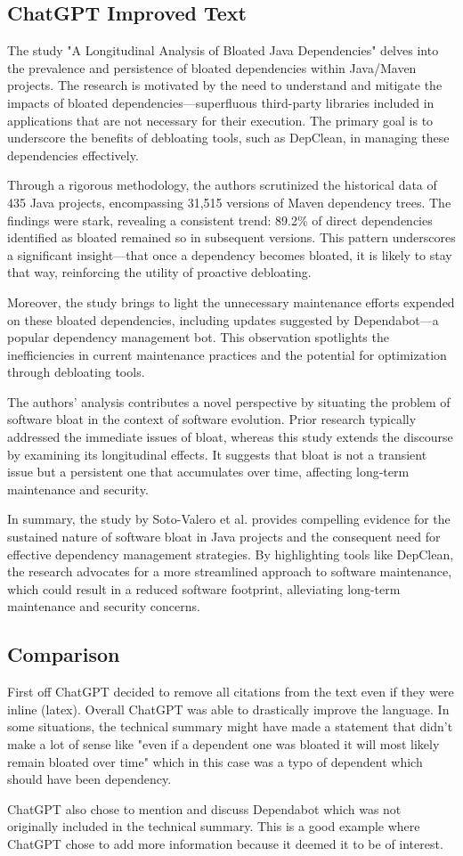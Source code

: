 \documentclass{article}
\begin{document}
\subsection{ChatGPT Improved Text}
The study "A Longitudinal Analysis of Bloated Java Dependencies" delves into the prevalence and persistence of bloated dependencies within Java/Maven projects. The research is motivated by the need to understand and mitigate the impacts of bloated dependencies—superfluous third-party libraries included in applications that are not necessary for their execution. The primary goal is to underscore the benefits of debloating tools, such as DepClean, in managing these dependencies effectively.

Through a rigorous methodology, the authors scrutinized the historical data of 435 Java projects, encompassing 31,515 versions of Maven dependency trees. The findings were stark, revealing a consistent trend: 89.2\% of direct dependencies identified as bloated remained so in subsequent versions. This pattern underscores a significant insight—that once a dependency becomes bloated, it is likely to stay that way, reinforcing the utility of proactive debloating.

Moreover, the study brings to light the unnecessary maintenance efforts expended on these bloated dependencies, including updates suggested by Dependabot—a popular dependency management bot. This observation spotlights the inefficiencies in current maintenance practices and the potential for optimization through debloating tools.

The authors' analysis contributes a novel perspective by situating the problem of software bloat in the context of software evolution. Prior research typically addressed the immediate issues of bloat, whereas this study extends the discourse by examining its longitudinal effects. It suggests that bloat is not a transient issue but a persistent one that accumulates over time, affecting long-term maintenance and security.

In summary, the study by Soto-Valero et al. provides compelling evidence for the sustained nature of software bloat in Java projects and the consequent need for effective dependency management strategies. By highlighting tools like DepClean, the research advocates for a more streamlined approach to software maintenance, which could result in a reduced software footprint, alleviating long-term maintenance and security concerns.

\subsection{Comparison}
First off ChatGPT decided to remove all citations from the text even if they were inline (latex). Overall ChatGPT was able to drastically improve the language. In some situations, the technical summary might have made a statement that didn't make a lot of sense like "even if a dependent one was bloated it will most likely remain bloated over time" which in this case was a typo of dependent which should have been dependency.

ChatGPT also chose to mention and discuss Dependabot which was not originally included in the technical summary. This is a good example where ChatGPT chose to add more information because it deemed it to be of interest.

\hspace{0cm}
\newpage
\end{document}

